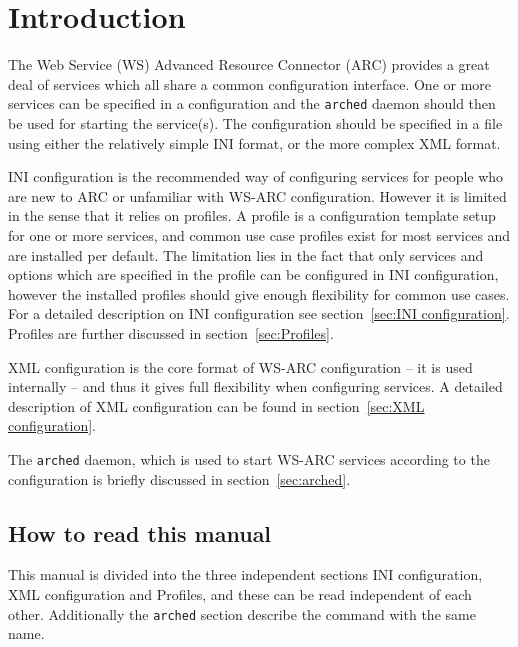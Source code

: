 \documentclass{article}
\renewcommand{\thefootnote}{\fnsymbol{footnote}}
\begin{document}
\newpage

\renewcommand{\thefootnote}{\arabic{footnote}}



\section{Introduction} %

The Web Service (WS) Advanced Resource Connector (ARC) provides a great deal of
services which all share a common configuration interface. One or more services
can be specified in a configuration and the \texttt{arched} daemon should then
be used for starting the service(s). The configuration should be
specified in a file using either the relatively simple INI format, or the more
complex XML format.

INI configuration is the recommended way of configuring services for people who
are new to ARC or unfamiliar with WS-ARC configuration. However it is limited in
the sense that it relies on profiles. A profile is a configuration
template setup for one or more services, and common use case profiles exist for
most services and are installed per default. The limitation lies in the fact
that only services and options which are specified in the profile can be
configured in INI configuration, however the installed profiles should give
enough flexibility for common use cases. For a detailed description on INI
configuration see section~\ref{sec:INI configuration}. Profiles are further
discussed in section~\ref{sec:Profiles}.

XML configuration is the core format of WS-ARC configuration -- it
is used internally -- and thus it gives full flexibility when configuring
services. A detailed description of XML configuration can be found in
section~\ref{sec:XML configuration}.

The \texttt{arched} daemon, which is used to start WS-ARC services according to
the configuration is briefly discussed in section~\ref{sec:arched}.

\subsection{How to read this manual}
This manual is divided into the three independent sections INI configuration,
XML configuration and Profiles, and these can be read independent of each other.
Additionally the \texttt{arched} section describe the command with the same
name.
\end{document}
